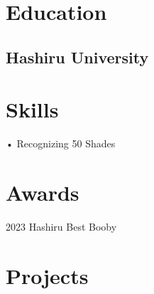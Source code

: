 \documentclass[]{deedy-resume-openfont}
\begin{document}
	\begin{minipage}[t]{0.33\textwidth}

		\section{Education}
		\begin{education}
			\subsection*{Hashiru University\\}   
		\end{education}
		\sectionsep


		\section{Skills}
		\begin{skills}
			• Recognizing 50 Shades
		\end{skills}
		\sectionsep


		\section{Awards}
		\begin{awards}
			2023 Hashiru Best Booby\\
		\end{awards}
		\sectionsep

	\end{minipage}
	\hfill
	\begin{minipage}[t]{0.66\textwidth}
		\section{Projects}
		\begin{projects}
		\end{projects}
		\sectionsep

	\end{minipage}
\end{document}
